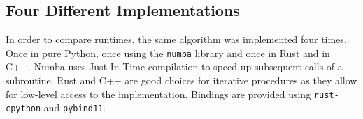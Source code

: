 \subsection{Four Different Implementations}
In order to compare runtimes, the same algorithm was implemented four times.
Once in pure Python, once using the \texttt{numba} library and once in Rust and in C++.
Numba uses Just-In-Time compilation to speed up subsequent calls of a subroutine.
Rust and C++ are good choices for iterative procedures as they allow for low-level access to the implementation. Bindings are provided using \texttt{rust-cpython} and \texttt{pybind11}.
